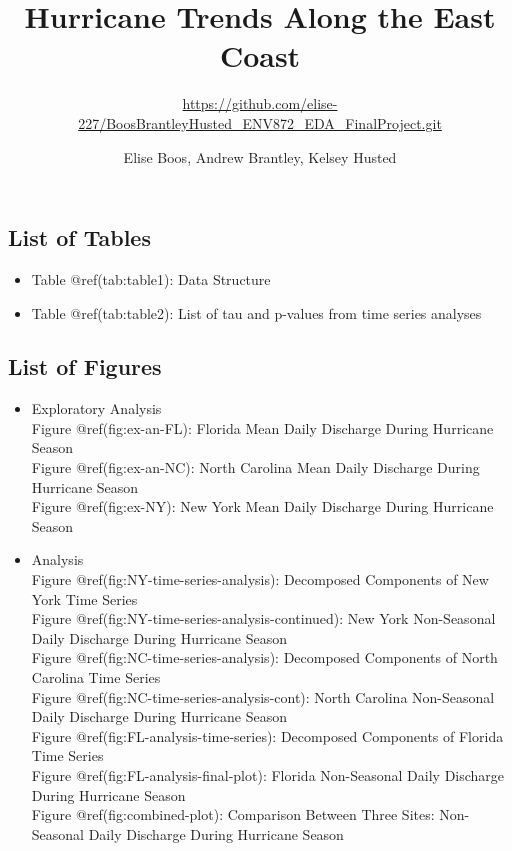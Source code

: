 \documentclass[
  12pt,
]{article}
\title{Hurricane Trends Along the East Coast}
\subtitle{\url{https://github.com/elise-227/BoosBrantleyHusted_ENV872_EDA_FinalProject.git}}
\author{Elise Boos, Andrew Brantley, Kelsey Husted}
\date{}
\providecommand{\tightlist}{%
  \setlength{\itemsep}{0pt}\setlength{\parskip}{0pt}}
\begin{document}
\maketitle

\newpage
\tableofcontents 
\newpage

\hypertarget{list-of-tables}{%
\subsection{List of Tables}\label{list-of-tables}}

\begin{itemize}
\tightlist
\item
  Table @ref(tab:table1): Data Structure
\item
  Table @ref(tab:table2): List of tau and p-values from time series
  analyses
\end{itemize}

\newpage

\hypertarget{list-of-figures}{%
\subsection{List of Figures}\label{list-of-figures}}

\begin{itemize}
\item
  Exploratory Analysis\\
  Figure @ref(fig:ex-an-FL): Florida Mean Daily Discharge During
  Hurricane Season\\
  Figure @ref(fig:ex-an-NC): North Carolina Mean Daily Discharge During
  Hurricane Season\\
  Figure @ref(fig:ex-NY): New York Mean Daily Discharge During Hurricane
  Season
\item
  Analysis\\
  Figure @ref(fig:NY-time-series-analysis): Decomposed Components of New
  York Time Series\\
  Figure @ref(fig:NY-time-series-analysis-continued): New York
  Non-Seasonal Daily Discharge During Hurricane Season\\
  Figure @ref(fig:NC-time-series-analysis): Decomposed Components of
  North Carolina Time Series\\
  Figure @ref(fig:NC-time-series-analysis-cont): North Carolina
  Non-Seasonal Daily Discharge During Hurricane Season\\
  Figure @ref(fig:FL-analysis-time-series): Decomposed Components of
  Florida Time Series\\
  Figure @ref(fig:FL-analysis-final-plot): Florida Non-Seasonal Daily
  Discharge During Hurricane Season\\
  Figure @ref(fig:combined-plot): Comparison Between Three Sites:
  Non-Seasonal Daily Discharge During Hurricane Season
\end{itemize}
\end{document}
